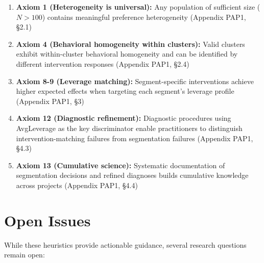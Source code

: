 \begin{enumerate}
\item \textbf{Axiom 1 (Heterogeneity is universal):} Any population of sufficient size ($N > 100$) contains meaningful preference heterogeneity (Appendix PAP1, §2.1)

\item \textbf{Axiom 4 (Behavioral homogeneity within clusters):} Valid clusters exhibit within-cluster behavioral homogeneity and can be identified by different intervention responses (Appendix PAP1, §2.4)

\item \textbf{Axiom 8-9 (Leverage matching):} Segment-specific interventions achieve higher expected effects when targeting each segment's leverage profile (Appendix PAP1, §3)

\item \textbf{Axiom 12 (Diagnostic refinement):} Diagnostic procedures using AvgLeverage as the key discriminator enable practitioners to distinguish intervention-matching failures from segmentation failures (Appendix PAP1, §4.3)

\item \textbf{Axiom 13 (Cumulative science):} Systematic documentation of segmentation decisions and refined diagnoses builds cumulative knowledge across projects (Appendix PAP1, §4.4)
\end{enumerate}


\section{Open Issues}
\label{sec:h-open-issues}

While these heuristics provide actionable guidance, several research questions remain open:


